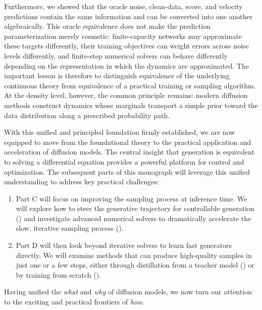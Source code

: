 Furthermore, we showed that the oracle noise, clean-data, score, and velocity
predictions contain the same information and can be converted into one another
algebraically. This oracle equivalence does not make the prediction
parameterization merely cosmetic: finite-capacity networks may approximate
these targets differently, their training objectives can weight errors across
noise levels differently, and finite-step numerical solvers can behave
differently depending on the representation in which the dynamics are
approximated. The important lesson is therefore to distinguish equivalence of
the underlying continuous theory from equivalence of a practical training or
sampling algorithm. At the density level, however, the common principle remains: modern diffusion
methods construct dynamics whose marginals transport a simple prior toward the
data distribution along a prescribed probability path.


With this unified and principled foundation firmly established, we are now equipped to move from the foundational theory to the practical application and acceleration of diffusion models. The central insight that generation is equivalent to solving a differential equation provides a powerful platform for control and optimization. The subsequent parts of this monograph will leverage this unified understanding to address key practical challenges:
\begin{enumerate}
    \item Part C will focus on improving the sampling process at inference time. We will explore how to steer the generative trajectory for controllable generation () and investigate advanced numerical solvers to dramatically accelerate the slow, iterative sampling process ().
    \item Part D will then look beyond iterative solvers to learn fast generators directly. We will examine methods that can produce high-quality samples in just one or a few steps, either through distillation from a teacher model () or by training from scratch ().
\end{enumerate}

Having unified the \textit{what} and \textit{why} of diffusion models, we now turn our attention to the exciting and practical frontiers of \textit{how}.









